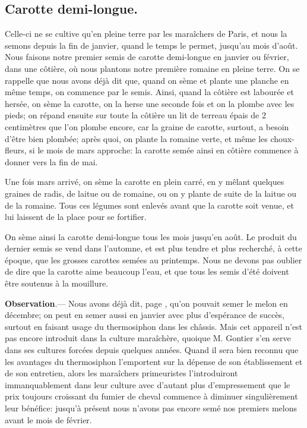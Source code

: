 \documentclass[10pt,a4paper]{book}
\begin{document}
\subsection{Carotte demi-longue.}

Celle-ci ne se cultive qu'en pleine terre par les maraîchers de Paris, et nous la semons depuis la fin de janvier, quand le temps le permet, jusqu'au mois d'août. Nous faisons notre premier semis de carotte demi-longue en janvier ou février, dans une côtière, où nous plantons notre première romaine en pleine terre. On se rappelle que nous avons déjà dit que, quand on sème et plante une planche en même temps, on commence par le semis. Ainsi, quand la côtière est labourée et hersée, on sème la carotte, on la herse une seconde fois et on la plombe avec les pieds; on répand ensuite sur toute la côtière un lit de terreau épais de 2 centimètres que l'on plombe encore, car la graine de carotte, surtout, a besoin d'être bien plombée; après quoi, on plante la romaine verte, et même les choux-fleurs, si le mois de mars approche: la carotte semée ainsi en côtière commence à donner vers la fin de mai.

Une fois mars arrivé, on sème la carotte en plein carré, en y mêlant quelques graines de radis, de laitue ou de romaine, ou on y plante de suite de la laitue ou de la romaine. Tous ces légumes sont enlevés avant que la carotte soit venue, et lui laissent de la place pour se fortifier.

On sème ainsi la carotte demi-longue tous les mois jusqu'en août. Le produit du dernier semis se vend dans l'automne, et est plus tendre et plus recherché, à cette époque, que les grosses carottes semées au printemps. Nous ne devons pas oublier de dire que la carotte aime beaucoup l'eau, et que tous les semis d'été doivent être soutenus à la mouillure.

{\small \textbf{Observation}.--- Nous avons déjà dit, page \pageref{radisnoirobservations}, qu'on pouvait semer le melon en décembre; on peut en semer aussi en janvier avec plus d'espérance de succès, surtout en faisant usage du thermosiphon dans les châssis. Mais cet appareil n'est pas encore introduit dans la culture maraîchère, quoique M. Gontier s'en serve dans ses cultures forcées depuis quelques années. Quand il sera bien reconnu que les avantages du thermosiphon l'emportent sur la dépense de son établissement et de son entretien, alors les maraîchers primeuristes l'introduiront immanquablement dans leur culture avec d'autant plus d'empressement que le prix toujours croissant du fumier de cheval commence à diminuer singulièrement leur bénéfice: jusqu'à présent nous n'avons pas encore semé nos premiers melons avant le mois de février.}
\end{document}

